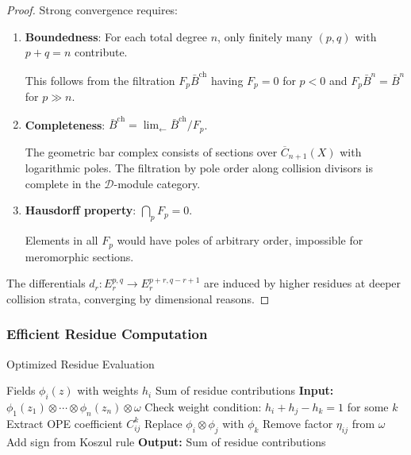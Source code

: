 \begin{proof}
Strong convergence requires:
\begin{enumerate}
\item \textbf{Boundedness}: For each total degree $n$, only finitely many $(p,q)$ with $p+q=n$ contribute.

This follows from the filtration $F_p\bar{B}^{\text{ch}}$ having $F_p = 0$ for $p < 0$ and $F_p\bar{B}^n = \bar{B}^n$ for $p \gg n$.

\item \textbf{Completeness}: $\bar{B}^{\text{ch}} = \lim_{\leftarrow} \bar{B}^{\text{ch}}/F_p$.

The geometric bar complex consists of sections over $\overline{C}_{n+1}(X)$ with logarithmic poles. The filtration by pole order along collision divisors is complete in the $\mathcal{D}$-module category.

\item \textbf{Hausdorff property}: $\bigcap_p F_p = 0$.

Elements in all $F_p$ would have poles of arbitrary order, impossible for meromorphic sections.
\end{enumerate}

The differentials $d_r: E_r^{p,q} \to E_r^{p+r,q-r+1}$ are induced by higher residues at deeper collision strata, converging by dimensional reasons.
\end{proof}

\subsubsection{Efficient Residue Computation}
 
\begin{algorithm}
\caption{Optimized Residue Evaluation}
\label{alg:residue-evaluation}
\begin{algorithmic}[1]
\Require Fields $\phi_i(z)$ with weights $h_i$
\Ensure Sum of residue contributions
\State \textbf{Input:} $\phi_1(z_1) \otimes \cdots \otimes \phi_n(z_n) \otimes \omega$
    \State Check weight condition: $h_i + h_j - h_k = 1$ for some $k$
        \State Extract OPE coefficient $C^k_{ij}$
        \State Replace $\phi_i \otimes \phi_j$ with $\phi_k$
        \State Remove factor $\eta_{ij}$ from $\omega$
        \State Add sign from Koszul rule
    \EndIf
\EndFor
\State \textbf{Output:} Sum of residue contributions
\end{algorithmic}
\end{algorithm}

